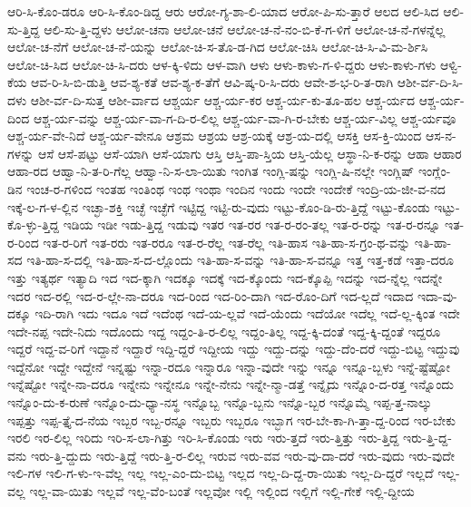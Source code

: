 {ಆರಿ-ಸಿ-ಕೊಂ-ಡರೂ
ಆರಿ-ಸಿ-ಕೊಂ-ಡಿದ್ದ
ಆರು
ಆರೋ-ಗ್ಯ-ಶಾ-ಲಿ-ಯಾದ
ಆರೋ-ಪಿ-ಸು-ತ್ತಾರೆ
ಆಲದ
ಆಲಿ-ಸಿದ
ಆಲಿ-ಸು-ತ್ತಿದ್ದ
ಆಲಿ-ಸು-ತ್ತಿ-ದ್ದಳು
ಆಲೋ-ಚನಾ
ಆಲೋ-ಚನೆ
ಆಲೋ-ಚ-ನೆ-ನಂ-ಬಿ-ಕೆ-ಗ-ಳಿಗೆ
ಆಲೋ-ಚ-ನೆ-ಗಳನ್ನೆಲ್ಲ
ಆಲೋ-ಚ-ನೆಗೆ
ಆಲೋ-ಚ-ನೆ-ಯನ್ನು
ಆಲೋ-ಚಿ-ಸ-ತೊ-ಡ-ಗಿದ
ಆಲೋ-ಚಿಸಿ
ಆಲೋ-ಚಿ-ಸಿ-ವಿ-ಮ-ರ್ಶಿಸಿ
ಆಲೋ-ಚಿ-ಸಿದ
ಆಲೋ-ಚಿ-ಸಿ-ದರು
ಆಳ-ಕ್ಕಿ-ಳಿದು
ಆಳ-ವಾಗಿ
ಆಳು
ಆಳು-ಕಾಳು-ಗ-ಳಿ-ದ್ದರು
ಆಳು-ಕಾಳು-ಗಳು
ಆಳ್ವಿ-ಕೆಯ
ಆವ-ರಿ-ಸಿ-ಬಿ-ಡುತ್ತಿ
ಆವ-ಶ್ಯ-ಕತೆ
ಆವ-ಶ್ಯ-ಕ-ತೆಗೆ
ಆವಿ-ಷ್ಕ-ರಿ-ಸಿ-ದರು
ಆವೇ-ಶ-ಭ-ರಿ-ತ-ರಾಗಿ
ಆಶೀ-ರ್ವ-ದಿ-ಸಿ-ದಳು
ಆಶೀ-ರ್ವ-ದಿ-ಸುತ್ತ
ಆಶೀ-ರ್ವಾದ
ಆಶ್ಚರ್ಯ
ಆಶ್ಚ-ರ್ಯ-ಕರ
ಆಶ್ಚ-ರ್ಯ-ಕು-ತೂ-ಹಲ
ಆಶ್ಚ-ರ್ಯದ
ಆಶ್ಚ-ರ್ಯ-ದಿಂದ
ಆಶ್ಚ-ರ್ಯ-ವನ್ನು
ಆಶ್ಚ-ರ್ಯ-ವಾ-ಗ-ದಿ-ರ-ಲಿಲ್ಲ
ಆಶ್ಚ-ರ್ಯ-ವಾ-ಗಿ-ರ-ಬೇಕು
ಆಶ್ಚ-ರ್ಯ-ವಿಲ್ಲ
ಆಶ್ಚ-ರ್ಯವೂ
ಆಶ್ಚ-ರ್ಯ-ವೇ-ನಿದೆ
ಆಶ್ಚ-ರ್ಯ-ವೇನೂ
ಆಶ್ರಮ
ಆಶ್ರಯ
ಆಶ್ರ-ಯಕ್ಕೆ
ಆಶ್ರ-ಯ-ದಲ್ಲಿ
ಆಸಕ್ತಿ
ಆಸ-ಕ್ತಿ-ಯಿಂದ
ಆಸ-ನ-ಗಳನ್ನು
ಆಸೆ
ಆಸೆ-ಪಟ್ಟು
ಆಸೆ-ಯಾಗಿ
ಆಸೆ-ಯಾಗು
ಆಸ್ತಿ
ಆಸ್ತಿ-ಪಾ-ಸ್ತಿಯ
ಆಸ್ತಿ-ಯೆಲ್ಲ
ಆಸ್ಥಾ-ನಿ-ಕ-ರನ್ನು
ಆಹಾ
ಆಹಾರ
ಆಹಾ-ರದ
ಆಹ್ವಾ-ನಿ-ತ-ರಿ-ಗೆಲ್ಲ
ಆಹ್ವಾ-ನಿ-ಸ-ಲಾ-ಯಿತು
ಇಂಗಿತ
ಇಂಗ್ಲಿ-ಷನ್ನು
ಇಂಗ್ಲಿ-ಷಿ-ನಲ್ಲೇ
ಇಂಗ್ಲಿಷ್
ಇಂಗ್ಲೆಂ-ಡಿನ
ಇಂಚ-ರ-ಗಳಿಂದ
ಇಂತಹ
ಇಂತಿಂಥ
ಇಂಥ
ಇಂಥಾ
ಇಂದಿನ
ಇಂದು
ಇಂದೇ
ಇಂದೇಕೆ
ಇಂದ್ರಿ-ಯ-ಜೀ-ವ-ನದ
ಇಕ್ಕೆ-ಲ-ಗ-ಳ-ಲ್ಲಿನ
ಇಚ್ಛಾ-ಶಕ್ತಿ
ಇಚ್ಛೆ
ಇಚ್ಛೆಗೆ
ಇಟ್ಟಿದ್ದ
ಇಟ್ಟಿ-ರು-ವುದು
ಇಟ್ಟು-ಕೊಂ-ಡಿ-ರು-ತ್ತಿದ್ದೆ
ಇಟ್ಟು-ಕೊಂಡು
ಇಟ್ಟು-ಕೊ-ಳ್ಳು-ತ್ತಿದ್ದ
ಇಡಿಯ
ಇಡೀ
ಇಡು-ತ್ತಿದ್ದ
ಇಡುವು
ಇತರ
ಇತ-ರರ
ಇತ-ರ-ರಂ-ತಲ್ಲ
ಇತ-ರ-ರನ್ನು
ಇತ-ರ-ರನ್ನೂ
ಇತ-ರ-ರಿಂದ
ಇತ-ರ-ರಿಗೆ
ಇತ-ರರು
ಇತ-ರರೂ
ಇತ-ರ-ರೆಲ್ಲ
ಇತ-ರೆಲ್ಲ
ಇತಿ-ಹಾಸ
ಇತಿ-ಹಾ-ಸ-ಗ್ರಂ-ಥ-ವನ್ನು
ಇತಿ-ಹಾ-ಸದ
ಇತಿ-ಹಾ-ಸ-ದಲ್ಲಿ
ಇತಿ-ಹಾ-ಸ-ದ-ಲ್ಲೊಂದು
ಇತಿ-ಹಾ-ಸ-ವನ್ನು
ಇತಿ-ಹಾ-ಸ-ವನ್ನೂ
ಇತ್ತ
ಇತ್ತ-ಕಡೆ
ಇತ್ತಾ-ದರೂ
ಇತ್ತು
ಇತ್ಯರ್ಥ
ಇತ್ಯಾದಿ
ಇದ
ಇದ-ಕ್ಕಾಗಿ
ಇದಕ್ಕೂ
ಇದಕ್ಕೆ
ಇದ-ಕ್ಕೊಂದು
ಇದ-ಕ್ಕೊಪ್ಪಿ
ಇದನ್ನು
ಇದ-ನ್ನೆಲ್ಲ
ಇದನ್ನೇ
ಇದರ
ಇದ-ರಲ್ಲಿ
ಇದ-ರ-ಲ್ಲೇ-ನಾ-ದರೂ
ಇದ-ರಿಂದ
ಇದ-ರಿಂ-ದಾಗಿ
ಇದ-ರೊಂ-ದಿಗೆ
ಇದ-ಲ್ಲದೆ
ಇದಾದ
ಇದಾ-ವು-ದಕ್ಕೂ
ಇದಿ-ರಾಗಿ
ಇದು
ಇದೂ
ಇದೆ
ಇದೆಂಥ
ಇದೆ-ಯ-ಲ್ಲವೆ
ಇದೆ-ಯೆಂದು
ಇದೆಯೋ
ಇದೆಲ್ಲ
ಇದೆ-ಲ್ಲ-ಕ್ಕಿಂತ
ಇದೇ
ಇದೇ-ನಪ್ಪ
ಇದೇ-ನಿದು
ಇದೊಂದು
ಇದ್ದ
ಇದ್ದಂ-ತಿ-ರ-ಲಿಲ್ಲ
ಇದ್ದಂ-ತಿಲ್ಲ
ಇದ್ದ-ಕ್ಕಿ-ದಂತೆ
ಇದ್ದ-ಕ್ಕಿ-ದ್ದಂತೆ
ಇದ್ದರೂ
ಇದ್ದರೆ
ಇದ್ದ-ವ-ರಿಗೆ
ಇದ್ದಾನೆ
ಇದ್ದಾರೆ
ಇದ್ದಿ-ದ್ದರೆ
ಇದ್ದೀಯ
ಇದ್ದು
ಇದ್ದು-ದನ್ನು
ಇದ್ದು-ದೆಂ-ದರೆ
ಇದ್ದು-ಬಿಟ್ಟ
ಇದ್ದುವು
ಇದ್ದೆನೋ
ಇದ್ದೇ
ಇದ್ದೇನೆ
ಇನ್ನಷ್ಟು
ಇನ್ನಾ-ರದೂ
ಇನ್ನಾರೂ
ಇನ್ನಾ-ವುದೇ
ಇನ್ನು
ಇನ್ನೂ
ಇನ್ನೂ-ಬ್ಬಳು
ಇನ್ನೆ-ಷ್ಟೆಷ್ಟೋ
ಇನ್ನೆಷ್ಟೋ
ಇನ್ನೇ-ನಾ-ದರೂ
ಇನ್ನೇನು
ಇನ್ನೇನೂ
ಇನ್ನೇ-ನೇನು
ಇನ್ನೇ-ನ್ಮಾ-ಡತ್ತೆ
ಇನ್ನೈದು
ಇನ್ನೊಂ-ದ-ರತ್ತ
ಇನ್ನೊಂದು
ಇನ್ನೊಂ-ದು-ಕ-ರುಣೆ
ಇನ್ನೊಂ-ದು-ಧ್ಯಾ-ನಸ್ಥ
ಇನ್ನೊಬ್ಬ
ಇನ್ನೊ-ಬ್ಬನು
ಇನ್ನೊ-ಬ್ಬರ
ಇನ್ನೊಮ್ಮೆ
ಇಪ್ಪ-ತ್ತ-ನಾಲ್ಕು
ಇಪ್ಪತ್ತು
ಇಪ್ಪ-ತ್ತೈ-ದ-ನೆಯ
ಇಬ್ಬರ
ಇಬ್ಬ-ರನ್ನೂ
ಇಬ್ಬರು
ಇಬ್ಬರೂ
ಇಬ್ಭಾಗ
ಇರ-ಬೇ-ಕಾ-ಗಿ-ತ್ತಾ-ದ್ದ-ರಿಂದ
ಇರ-ಬೇಕು
ಇರಲಿ
ಇರ-ಲಿಲ್ಲ
ಇರಿದು
ಇರಿ-ಸ-ಲಾ-ಗಿತ್ತು
ಇರಿ-ಸಿ-ಕೊಂಡು
ಇರು
ಇರು-ತ್ತದೆ
ಇರು-ತ್ತಿತ್ತು
ಇರು-ತ್ತಿದ್ದ
ಇರು-ತ್ತಿ-ದ್ದ-ವನು
ಇರು-ತ್ತಿ-ದ್ದುದು
ಇರು-ತ್ತಿದ್ದೆ
ಇರು-ತ್ತಿ-ರ-ಲಿಲ್ಲ
ಇರುವ
ಇರು-ವವ
ಇರು-ವು-ದಾ-ದರೆ
ಇರು-ವುದು
ಇರು-ವುದೇ
ಇಲಿ-ಗಳ
ಇಲಿ-ಗ-ಳು-ಇ-ವೆಲ್ಲ
ಇಲ್ಲ
ಇಲ್ಲ-ಎಂ-ದು-ಬಿಟ್ಟ
ಇಲ್ಲದ
ಇಲ್ಲ-ದಿ-ದ್ದ-ರಾ-ಯಿತು
ಇಲ್ಲ-ದಿ-ದ್ದರೆ
ಇಲ್ಲದೆ
ಇಲ್ಲ-ವಲ್ಲ
ಇಲ್ಲ-ವಾ-ಯಿತು
ಇಲ್ಲವೆ
ಇಲ್ಲ-ವೆಂ-ಬಂತೆ
ಇಲ್ಲವೋ
ಇಲ್ಲಿ
ಇಲ್ಲಿಂದ
ಇಲ್ಲಿಗೆ
ಇಲ್ಲಿ-ಗೇಕೆ
ಇಲ್ಲಿ-ದ್ದೀಯ
}
